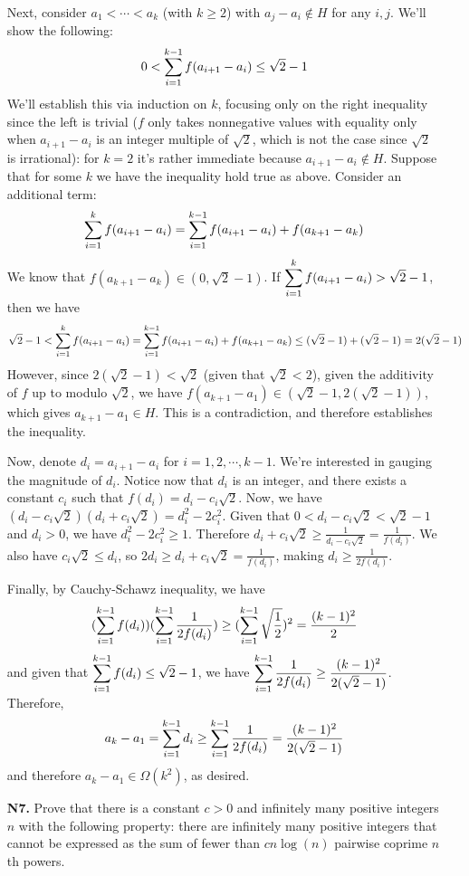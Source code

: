 \documentclass[11pt,a4paper]{article}
\begin{document}
\begin{enumerate}
	Next, consider $a_1<\cdots < a_k$ (with $k\ge 2$) with $a_j-a_i\not\in H$ for any $i, j$. We'll show the following: 
	\[
	0 < \dsum_{i=1}^{k-1} f(a_{i+1}-a_i) \le \sqrt{2} - 1
	\]
	We'll establish this via induction on $k$, focusing only on the right inequality since the left is trivial ($f$ only takes nonnegative values with equality only when $a_{i+1}-a_i$ is an integer multiple of $\sqrt{2}$, which is not the case since $\sqrt{2}$ is irrational): for $k=2$ it's rather immediate because $a_{i+1}-a_i\not\in H$. Suppose that for some $k$ we have the inequality hold true as above. Consider an additional term: 
	\[
	\dsum_{i=1}^{k} f(a_{i+1}-a_i)=\dsum_{i=1}^{k-1} f(a_{i+1}-a_i) + f(a_{k+1}-a_k)
	\]
	We know that $f(a_{k+1}-a_k)\in (0, \sqrt{2}-1)$. If $\dsum_{i=1}^{k} f(a_{i+1}-a_i)> \sqrt{2}-1$, then we have 
	\[
	\sqrt{2}-1 < \dsum_{i=1}^{k} f(a_{i+1}-a_i) = \dsum_{i=1}^{k-1} f(a_{i+1}-a_i) + f(a_{k+1}-a_k) \le (\sqrt{2}-1)+(\sqrt{2}-1) = 2(\sqrt{2}-1)
	\]
	However, since $2(\sqrt{2}-1) < \sqrt{2}$ (given that $\sqrt{2}<2$), given the additivity of $f$ up to modulo $\sqrt{2}$, we have $f(a_{k+1}-a_1)\in (\sqrt{2}-1, 2(\sqrt{2}-1))$, which gives $a_{k+1}-a_1\in H$. This is a contradiction, and therefore establishes the inequality. 
	
	Now, denote $d_i=a_{i+1}-a_i$ for $i=1, 2, \cdots , k-1$. We're interested in gauging the magnitude of $d_i$.  Notice now that $d_i$ is an integer, and there exists a constant $c_i$ such that $f(d_i)=d_i-c_i\sqrt{2}$. Now, we have $(d_i-c_i\sqrt{2})(d_i+c_i\sqrt{2})=d_i^2-2c_i^2$. Given that $0<d_i-c_i\sqrt{2}<\sqrt{2}-1$ and $d_i>0$, we have $d_i^2-2c_i^2\ge 1$. Therefore $d_i+c_i\sqrt{2}\ge \frac{1}{d_i-c_i\sqrt{2}}=\frac{1}{f(d_i)}$. We also have $c_i\sqrt{2}\le d_i$, so $2d_i\ge d_i+c_i\sqrt{2}=\frac{1}{f(d_i)}$, making $d_i\ge \frac{1}{2f(d_i)}$. 
	
	Finally, by Cauchy-Schawz inequality, we have 
	\[
	(\dsum_{i=1}^{k-1} f(d_i))(\dsum_{i=1}^{k-1} \frac{1}{2f(d_i)})\ge (\dsum_{i=1}^{k-1}\sqrt{\frac{1}{2}})^2 = \frac{(k-1)^2}{2}
	\]
	and given that $\dsum_{i=1}^{k-1} f(d_i)\le \sqrt{2}-1$, we have $\dsum_{i=1}^{k-1} \frac{1}{2f(d_i)}\ge \frac{(k-1)^2}{2(\sqrt{2}-1)}$. Therefore, 
	\[
	a_k-a_1 =\dsum_{i=1}^{k-1} d_i \ge \dsum_{i=1}^{k-1} \frac{1}{2f(d_i)} = \frac{(k-1)^2}{2(\sqrt{2}-1)}
	\]
	and therefore $a_k-a_1\in \Omega(k^2)$, as desired. 
	
	\item[\textbf{N7.}] Prove that there is a constant $c>0$ and infinitely many positive integers $n$ with the following property: there are infinitely many positive integers that cannot be expressed as the sum of fewer than $cn\log(n)$ pairwise coprime $n$th powers.
	

\end{enumerate}
\end{document}
